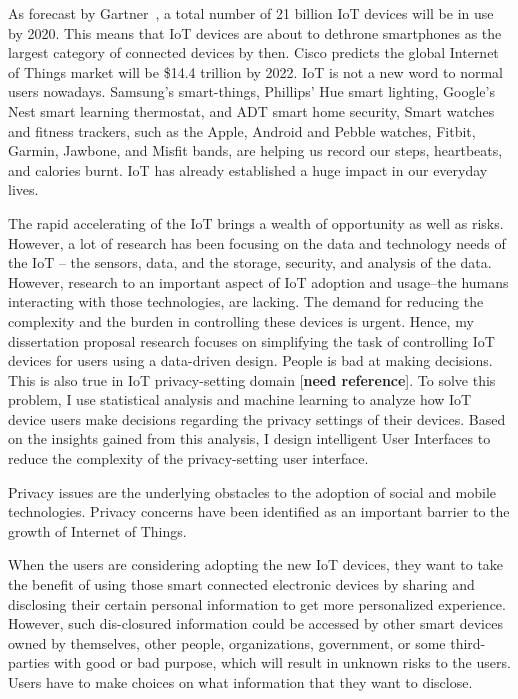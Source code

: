As forecast by Gartner~\cite{van_der_meulen_gartner_nodate}, a total number of 21 billion IoT devices will be in use by 2020. This means that IoT devices are about to dethrone smartphones as the largest category of connected devices by then. Cisco predicts the global Internet of Things market will be
\$14.4 trillion by 2022.
IoT is not a new word to normal users nowadays. Samsung's smart-things, Phillips' Hue smart lighting, Google's Nest smart learning thermostat, and ADT smart home security, Smart watches and fitness trackers, such as the Apple, Android and Pebble watches, Fitbit, Garmin, Jawbone, and Misfit bands, are helping us record our steps, heartbeats, and calories burnt. IoT has already established a huge impact in our everyday lives. 

The rapid accelerating of the IoT brings a wealth of opportunity as well as risks. However, a lot of research has been focusing on the data and technology needs of the IoT -- the sensors, data, and the storage, security, and analysis of the data. However, research to an important aspect of IoT adoption and usage--the humans interacting with those technologies, are lacking. The demand for reducing the complexity and the burden in controlling these devices is urgent. Hence, my dissertation proposal research focuses on simplifying the task of controlling IoT devices for users using a data-driven design. People is bad at making decisions. This is also true in IoT privacy-setting domain [\textbf{need reference}]. To solve this problem, I use statistical analysis and machine learning to analyze how IoT device users make decisions regarding the privacy settings of their devices. Based on the insights gained from this analysis, I design intelligent User Interfaces to reduce the complexity of the privacy-setting user interface.

Privacy issues are the underlying obstacles to the adoption of social and mobile technologies. Privacy concerns have been identified as an important barrier to the growth of Internet of Things. 

When the users are considering adopting the new IoT devices, they want to take the benefit of using those smart connected electronic devices by sharing and disclosing their certain personal information to get more personalized experience. However, such dis-closured information could be accessed by other smart devices owned by themselves, other people, organizations, government, or some third-parties with good or bad purpose, which will result in unknown risks to the users. Users have to make choices on what information that they want to disclose.


